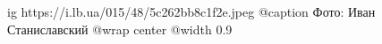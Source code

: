  
 
 
 
 

\ifcmt
  ig https://i.lb.ua/015/48/5c262bb8c1f2e.jpeg
	@caption Фото: Иван Станиславский
  @wrap center
  @width 0.9
\fi

